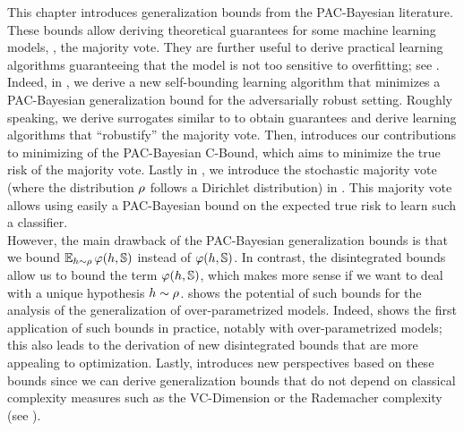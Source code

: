 This chapter introduces generalization bounds from the PAC-Bayesian literature.
These bounds allow deriving theoretical guarantees for some machine learning models, \eg, the majority vote.
They are further useful to derive practical learning algorithms guaranteeing that the model is not too sensitive to overfitting; see .
Indeed, in , we derive a new self-bounding learning algorithm that minimizes a PAC-Bayesian generalization bound for the adversarially robust setting.
Roughly speaking, we derive surrogates similar to  to obtain guarantees and derive learning algorithms that ``robustify'' the majority vote.
Then,  introduces our contributions to minimizing of the PAC-Bayesian C-Bound, which aims to minimize the true risk of the majority vote.
Lastly in , we introduce the stochastic majority vote (where the distribution $\Q$ follows a Dirichlet distribution) in . 
This majority vote allows using easily a PAC-Bayesian bound on the expected true risk to learn such a classifier.\\

However, the main drawback of the PAC-Bayesian generalization bounds is that we bound $\EE_{\h\sim\Q}\varphi(h,\S)$ instead of $\varphi(h,\S)$.
In contrast, the disintegrated bounds allow us to bound the term $\varphi(h,\S)$, which makes more sense if we want to deal with a unique hypothesis $h\sim\Q$.
 shows the potential of such bounds for the analysis of the generalization of over-parametrized models.
Indeed,  shows the first application of such bounds in practice, notably with over-parametrized models; this also leads to the derivation of new disintegrated bounds that are more appealing to optimization.
Lastly,  introduces new perspectives based on these bounds since we can derive generalization bounds that do not depend on classical complexity measures such as the VC-Dimension or the Rademacher complexity (see ).